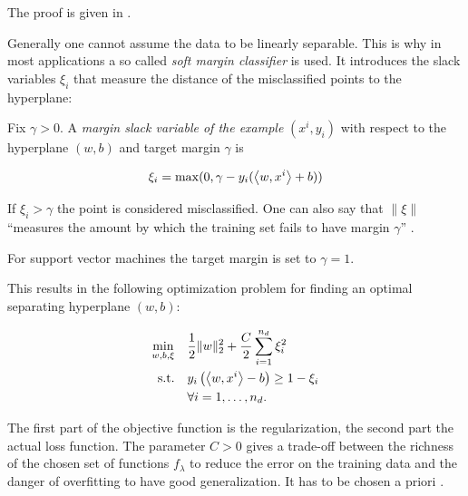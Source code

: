 The proof is given in \cite[chapter 6.1]{Cristianini2000}. 

Generally one cannot assume the data to be linearly separable. This is why in most applications a so called \emph{soft margin classifier} is used. It introduces the slack variables \(\xi_i\) that measure the distance of the misclassified points to the hyperplane:


Fix \(\gamma > 0\). A \emph{margin slack variable of the example} \((x^i,y_i)\) with respect to the hyperplane \((w,b)\) and target margin \(\gamma\) is 

\[\xi_i = \max(0, \gamma - y_i(\left\langle w,x^i\right\rangle+b))\] 

If \(\xi_i > \gamma\) the point is considered misclassified. 
One can also say that \(\|\xi\|\) ``measures the amount by which the training set fails to have margin \(\gamma\)'' \cite[section 2.1.1]{Cristianini2000}.

For support vector machines the target margin is set to \(\gamma = 1\).


This results in the following optimization problem for finding an optimal separating hyperplane \((w,b)\): 


%
\begin{align}
\begin{split}
	\min_{w,b,\xi} \quad & \frac{1}{2} \|w\|^2_2+\frac{C}{2}\sum_{i=1}^{n_d}{\xi_i^2} \vspace{0.5ex}\\
	\text{s.t.} \quad & y_i\left(\Langle w,x^i\Rangle-b\right) \geq 1 - \xi_i \vspace{0.5ex}\\
	& 	\forall i = 1, \dots , n_d.
\end{split}
\label{SVM_2}
\end{align}

The first part of the objective function is the regularization, the second part the actual loss function. 
The parameter \(C > 0\) gives a trade-off between the richness of the chosen set of functions \(f_{\lambda}\) to reduce the error on the training data and the danger of overfitting to have good generalization. It has to be chosen a priori \cite{Kunapuli2008}.

